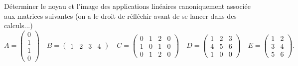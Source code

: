 \documentclass[a4paper, 11pt,reqno]{article}
\begin{document}
\begin{exercice}  \;
	D\'eterminer le noyau et l'image des applications lin\'eaires canoniquement associ\'ee aux matrices suivantes (on a le droit de r\'efl\'echir avant de se lancer dans des calculs...)
	$$A=\left(\begin{array}{l} 0\\ 1\\ 1\\0  \end{array}\right)\quad B=\left(\begin{array}{llll} 1&2&3&4 \end{array}\right)\quad
		C=\left(\begin{array}{llll} 0&1&2&0\\ 1&0&1&0\\ 0&1&2&0  \end{array}\right)\quad
		D=\left(\begin{array}{lll} 1&2&3\\ 4&5&6\\ 1&0&0  \end{array}\right)\quad E=\left(\begin{array}{ll} 1&2\\ 3&4\\ 5&6  \end{array}\right).$$
\end{exercice}
\end{document}
